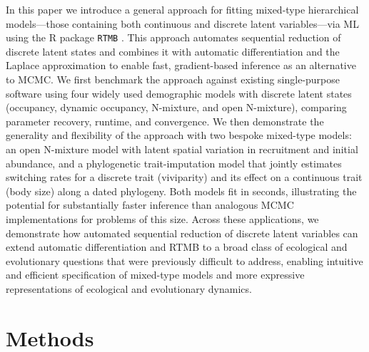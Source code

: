 \documentclass[11pt]{article}
\begin{document}
In this paper we introduce a general approach for fitting mixed-type hierarchical models—those containing both continuous and discrete latent variables—via ML using the R package \texttt{RTMB} \citep{kristensen_rtmb_2024}. This approach automates sequential reduction of discrete latent states and combines it with automatic differentiation and the Laplace approximation to enable fast, gradient-based inference as an alternative to MCMC. We first benchmark the approach against existing single-purpose software using four widely used demographic models with discrete latent states (occupancy, dynamic occupancy, N-mixture, and open N-mixture), comparing parameter recovery, runtime, and convergence. We then demonstrate the generality and flexibility of the approach with two bespoke mixed-type models: an open N-mixture model with latent spatial variation in recruitment and initial abundance, and a phylogenetic trait-imputation model that jointly estimates switching rates for a discrete trait (viviparity) and its effect on a continuous trait (body size) along a dated phylogeny. Both models fit in seconds, illustrating the potential for substantially faster inference than analogous MCMC implementations for problems of this size. Across these applications, we demonstrate how automated sequential reduction of discrete latent variables can extend automatic differentiation and RTMB to a broad class of ecological and evolutionary questions that were previously difficult to address, enabling intuitive and efficient specification of mixed-type models and more expressive representations of ecological and evolutionary dynamics.

\section{Methods}
\end{document}
